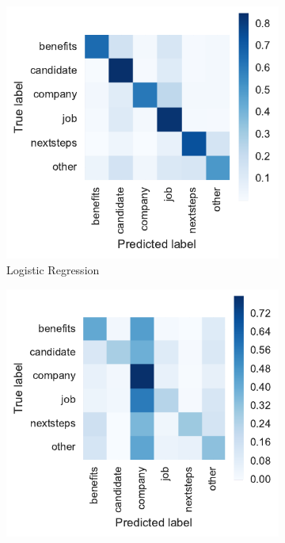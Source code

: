 \begin{figure}[h]
    \centering
    \begin{subfigure}[b]{0.32\textwidth}
        \includegraphics[width=\textwidth]{img/exp-vector-space-conf-matrix-bom-logreg-normalized.pdf}
        \caption{Logistic Regression}
        \label{fig:exp-vector-space-conf-matrix-bom-logreg-normalized}
    \end{subfigure}
    \begin{subfigure}[b]{0.32\textwidth}
        \includegraphics[width=\textwidth]{img/exp-vector-space-conf-matrix-bom-naivebayes-normalized.pdf}

\end{subfigure}
\end{figure}
